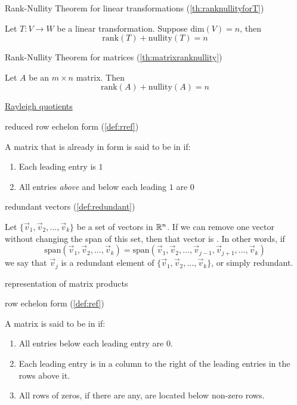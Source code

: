 \documentclass{ximera}
\begin{document}
Rank-Nullity Theorem for linear transformations (\ref{th:ranknullityforT})
\begin{expandable}
    Let $T:V\rightarrow W$ be a linear transformation.  Suppose $\mbox{dim}(V)=n$, then
$$\mbox{rank}(T)+\mbox{nullity}(T)=n$$
\end{expandable}

Rank-Nullity Theorem for matrices (\ref{th:matrixranknullity})
\begin{expandable}
    Let $A$ be an $m\times n$ matrix.  Then 
$$\mbox{rank}(A)+\mbox{nullity}(A)=n$$
\end{expandable}

\href{https://ximera.osu.edu/oerlinalg/LinearAlgebra/EIG-0070/main}{Rayleigh quotients}

reduced row echelon form (\ref{def:rref})
\begin{expandable}
    A matrix that is already in  form is said to be in  if:
\begin{enumerate}
\item Each leading entry is $1$
\item All entries {\it above} and below each leading $1$ are $0$
\end{enumerate}
\end{expandable}

redundant vectors (\ref{def:redundant})
\begin{expandable}
    Let $\{\vec{v}_1,\vec{v}_2,\dots,\vec{v}_k\}$ be a set of vectors in $\mathbb{R}^n$.  If we can remove one vector without changing the span of this set, then that vector is .  In other words, if $$\mbox{span}\left(\vec{v}_1,\vec{v}_2,\dots,\vec{v}_k\right)=\mbox{span}\left(\vec{v}_1,\vec{v}_2,\dots,\vec{v}_{j-1},\vec{v}_{j+1},\dots,\vec{v}_k\right)$$ we say that $\vec{v}_j$ is a redundant element of $\{\vec{v}_1,\vec{v}_2,\dots,\vec{v}_k\}$, or simply redundant.
\end{expandable}

representation of matrix products

row echelon form (\ref{def:ref})
\begin{expandable}
    A matrix is said to be in  if:
\begin{enumerate}
\item All entries below each leading entry are 0.
\item Each leading entry is in a column to the right of the leading entries in the rows above it.
\item All rows of zeros, if there are any, are located below non-zero rows.
\end{enumerate}
\end{expandable}
\end{document}
